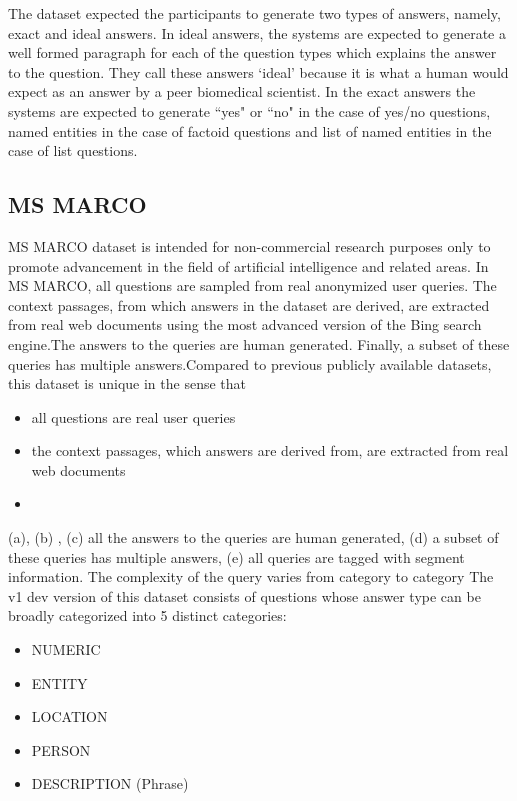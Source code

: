 The dataset expected the participants to generate two types of answers, namely, exact and ideal answers. In ideal answers, the systems are expected to generate a well formed paragraph for each of the question types which explains the answer to the question. They call these answers `ideal' because it is what a human would expect as an answer by a peer biomedical scientist. In the exact answers the systems are expected to generate ``yes" or ``no" in the case of yes/no questions, named entities in the case of factoid questions and list of named entities in the case of list questions.

\subsection{MS MARCO}
MS MARCO dataset is intended for non-commercial research purposes only to promote advancement in the field of artificial intelligence and related areas. In MS MARCO, all questions are sampled from real anonymized user queries. The context passages, from which answers in the dataset are derived, are extracted from real web documents using the most advanced version of the Bing search engine.The answers to the queries are human generated. Finally, a subset of these queries has multiple answers.Compared to previous publicly available datasets, this dataset is unique in the sense that
\begin{itemize}
    \item all questions are real user queries
    \item the context passages, which answers are derived from, are extracted from real web documents
    \item 
\end{itemize}(a), (b) , (c) all the answers to the queries are human generated, (d) a subset of these queries has multiple answers, (e) all queries are tagged with segment information. The complexity of the query varies from category to category The v1 dev version of this dataset consists of questions whose answer type can be broadly categorized into 5 distinct categories:
\begin{itemize}
    \item NUMERIC
    \item ENTITY
    \item LOCATION
    \item PERSON
    \item DESCRIPTION (Phrase)
\end{itemize}